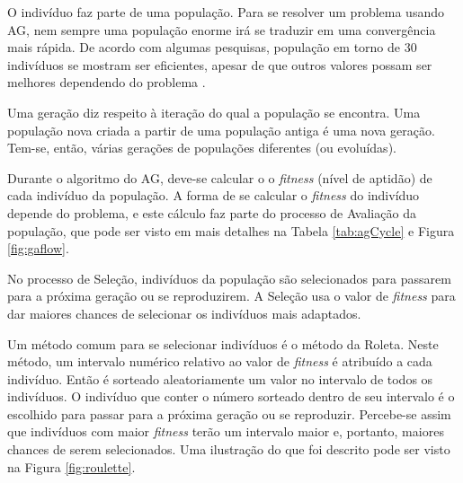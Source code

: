 \documentclass[
	12pt,					%
	openright,				%
	oneside,				%
	a4paper,				%
	bibjustif,				%
	chapter=TITLE,			%
	english,				%
	brazil,					%
	]{abntex2}
\begin{document}
	O indivíduo faz parte de uma população.
	Para se resolver um problema usando AG,
	nem sempre uma população enorme irá se traduzir em uma convergência mais rápida.
	De acordo com algumas pesquisas,
	população em torno de 30 indivíduos se mostram ser eficientes,
	apesar de que outros valores possam ser melhores dependendo do problema
	\cite{obitko}.
	
	Uma geração diz respeito à iteração do qual a população se encontra.
	Uma população nova criada a partir de uma população antiga é uma nova geração.
	Tem-se, então, várias gerações de populações diferentes (ou evoluídas).
	
	Durante o algoritmo do AG, deve-se calcular o o \textit{fitness} (nível de aptidão) de cada indivíduo da população.
	A forma de se calcular o \textit{fitness} do indivíduo depende do problema,
	e este cálculo faz parte do processo de Avaliação da população,
	que pode ser visto em mais detalhes na Tabela \ref{tab:agCycle} e Figura \ref{fig:gaflow}.
	
	No processo de Seleção,
	indivíduos da população são selecionados para passarem para a próxima geração ou se reproduzirem.
	A Seleção usa o valor de \textit{fitness} para dar maiores chances de selecionar os indivíduos mais adaptados.
	
	Um método comum para se selecionar indivíduos é o método da Roleta.
	Neste método, um intervalo numérico relativo ao valor de \textit{fitness} é atribuído a cada indivíduo.
	Então é sorteado aleatoriamente um valor no intervalo de todos os indivíduos.
	O indivíduo que conter o número sorteado dentro de seu intervalo é o escolhido para passar para a próxima geração ou se reproduzir.
	Percebe-se assim que indivíduos com maior \textit{fitness} terão um intervalo maior e, portanto, maiores chances de serem selecionados.
	Uma ilustração do que foi descrito pode ser visto na Figura \ref{fig:roulette}.
	
\end{document}

